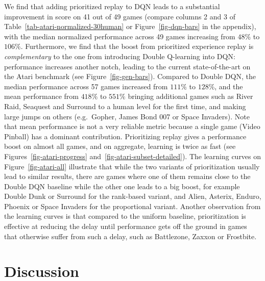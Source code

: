 \documentclass[a4paper]{article}
\begin{document}
We find that adding prioritized replay to DQN leads to a substantial improvement in score on 41 out of 49 games
(compare columns 2 and 3 of Table~\ref{tab-atari-normalized-30human} or Figure~\ref{fig-dqn-bars} in the appendix), 
with the median normalized performance across 49 games increasing from $48\%$ to $106\%$. 
Furthermore, we find that the boost from prioritized experience replay is \emph{complementary} to the one 
from introducing Double Q-learning into DQN: 
performance increases another notch, leading to the current state-of-the-art on the Atari benchmark
(see Figure~\ref{fig-gen-bars}). 
Compared to Double DQN, the median performance across 57 games increased from $111\%$ to $128\%$, and the mean performance from $418\%$ to $551\%$ bringing
additional games such as River Raid, Seaquest and Surround to a human level for the first time, and making large jumps on others (e.g.\ Gopher, James Bond 007 or Space Invaders).
Note that mean performance is not a very reliable metric because a single game (Video Pinball) has a dominant contribution.
Prioritizing replay gives a performance boost on almost all games, 
and on aggregate, learning is twice as fast (see Figures~\ref{fig-atari-progress} and~\ref{fig-atari-subset-detailed}).
The learning curves on Figure~\ref{fig-atari-all} illustrate that while the two variants of prioritization usually lead to similar results,
there are games where one of them remains close to the Double DQN baseline while the other one leads to a big boost,
for example Double Dunk or Surround for the rank-based variant, and Alien, Asterix, Enduro, Phoenix or Space Invaders for the proportional variant.
Another observation from the learning curves is that compared to the uniform baseline, prioritization is effective at reducing the delay until performance gets off the ground in games that otherwise suffer from such a delay, such as Battlezone, Zaxxon or Frostbite. 


\section{Discussion}
\end{document}
